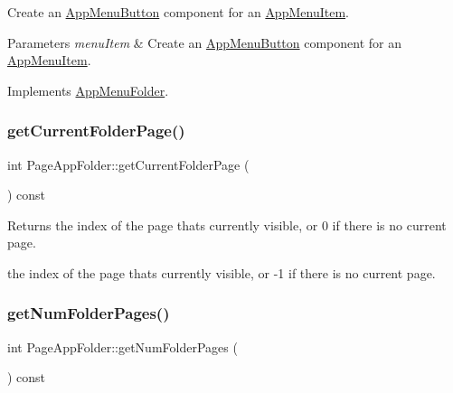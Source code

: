 Create an \mbox{\hyperlink{classAppMenuButton}{App\+Menu\+Button}} component for an \mbox{\hyperlink{classAppMenuItem}{App\+Menu\+Item}}.


\begin{DoxyParams}{Parameters}
{\em menu\+Item} & Create an \mbox{\hyperlink{classAppMenuButton}{App\+Menu\+Button}} component for an \mbox{\hyperlink{classAppMenuItem}{App\+Menu\+Item}}. \\
\hline
\end{DoxyParams}


Implements \mbox{\hyperlink{classAppMenuFolder_a001ecdee13bf394746b5d0b49dcc55cc}{App\+Menu\+Folder}}.

\mbox{\label{classPageAppFolder_a1ef76fbc32e943614313b30708ae8dac}} 
\subsubsection{\texorpdfstring{get\+Current\+Folder\+Page()}{getCurrentFolderPage()}}
{\footnotesize\ttfamily int Page\+App\+Folder\+::get\+Current\+Folder\+Page (\begin{DoxyParamCaption}{ }\end{DoxyParamCaption}) const}

\begin{DoxyReturn}{Returns}
the index of the page that\textquotesingle{}s currently visible, or 0 if there is no current page.

the index of the page that\textquotesingle{}s currently visible, or -\/1 if there is no current page. 
\end{DoxyReturn}
\mbox{\label{classPageAppFolder_a5f18f8c254b9cca63770b93bf881a9a4}} 
\subsubsection{\texorpdfstring{get\+Num\+Folder\+Pages()}{getNumFolderPages()}}
{\footnotesize\ttfamily int Page\+App\+Folder\+::get\+Num\+Folder\+Pages (\begin{DoxyParamCaption}{ }\end{DoxyParamCaption}) const}

